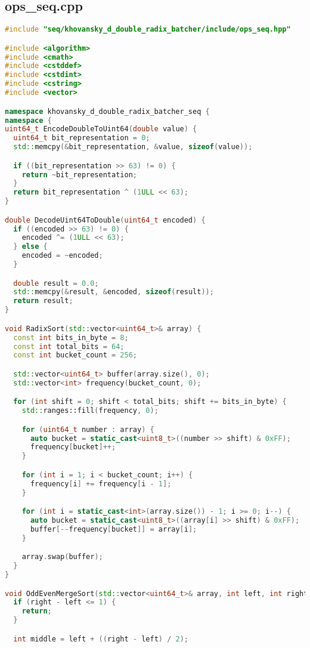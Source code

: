 \documentclass[12pt]{article}
\begin{document}
\subsection*{ops\_seq.cpp}
\begin{lstlisting}[language=C++,
    breaklines=true,       % Автоматический перенос строк
    columns=fullflexible ]
#include "seq/khovansky_d_double_radix_batcher/include/ops_seq.hpp"

#include <algorithm>
#include <cmath>
#include <cstddef>
#include <cstdint>
#include <cstring>
#include <vector>

namespace khovansky_d_double_radix_batcher_seq {
namespace {
uint64_t EncodeDoubleToUint64(double value) {
  uint64_t bit_representation = 0;
  std::memcpy(&bit_representation, &value, sizeof(value));

  if ((bit_representation >> 63) != 0) {
    return ~bit_representation;
  }
  return bit_representation ^ (1ULL << 63);
}

double DecodeUint64ToDouble(uint64_t encoded) {
  if ((encoded >> 63) != 0) {
    encoded ^= (1ULL << 63);
  } else {
    encoded = ~encoded;
  }

  double result = 0.0;
  std::memcpy(&result, &encoded, sizeof(result));
  return result;
}

void RadixSort(std::vector<uint64_t>& array) {
  const int bits_in_byte = 8;
  const int total_bits = 64;
  const int bucket_count = 256;

  std::vector<uint64_t> buffer(array.size(), 0);
  std::vector<int> frequency(bucket_count, 0);

  for (int shift = 0; shift < total_bits; shift += bits_in_byte) {
    std::ranges::fill(frequency, 0);

    for (uint64_t number : array) {
      auto bucket = static_cast<uint8_t>((number >> shift) & 0xFF);
      frequency[bucket]++;
    }

    for (int i = 1; i < bucket_count; i++) {
      frequency[i] += frequency[i - 1];
    }

    for (int i = static_cast<int>(array.size()) - 1; i >= 0; i--) {
      auto bucket = static_cast<uint8_t>((array[i] >> shift) & 0xFF);
      buffer[--frequency[bucket]] = array[i];
    }

    array.swap(buffer);
  }
}

void OddEvenMergeSort(std::vector<uint64_t>& array, int left, int right) {
  if (right - left <= 1) {
    return;
  }

  int middle = left + ((right - left) / 2);


\end{lstlisting}
\end{document}
